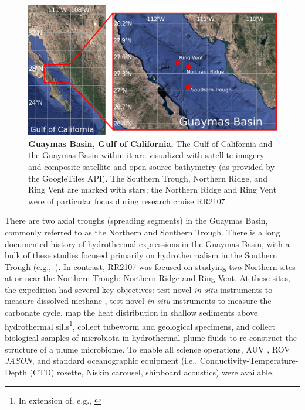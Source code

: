 \begin{figure}[!ht]
  \centering
  \includegraphics[width=\columnwidth]{figures/ops_guaymas.png}
  \caption[Guaymas Basin, Gulf of California.]{\textbf{Guaymas Basin, Gulf of California.} The Gulf of California and the Guaymas Basin within it are visualized with satellite imagery and composite satellite and open-source bathymetry (as provided by the GoogleTiles API). The Southern Trough, Northern Ridge, and Ring Vent are marked with stars; the Northern Ridge and Ring Vent were of particular focus during research cruise RR2107.}
  \label{fig:ops_map}
\end{figure}

There are two axial troughs (spreading segments) in the Guaymas Basin, commonly referred to as the Northern and Southern Trough. There is a long documented history of hydrothermal expressions in the Guaymas Basin, with a bulk of these studies focused primarily on hydrothermalism in the Southern Trough (e.g.,~\cite{ondreas2018recent, teske2016guaymas, seewald1994variations, von1985chemistry, lonsdale1985hydrothermal}). In contrast, RR2107 was focused on studying two Northern sites at or near the Northern Trough: Northern Ridge and Ring Vent. At these sites, the expedition had several key objectives: test novel \emph{in situ} instruments to measure dissolved methane \autocite{kapit2021dissolved,kapit2021measurement,michel2022gas}, test novel \emph{in situ} instruments to measure the carbonate cycle, map the heat distribution in shallow sediments above hydrothermal sills\footnote{In extension of, e.g., \cite{neumann2022heat}}, collect tubeworm and geological specimens, and collect biological samples of microbiota in hydrothermal plume-fluids to re-construct the structure of a plume microbiome. To enable all science operations, AUV \Sentry, ROV \emph{JASON}, and standard oceanographic equipment (i.e., Conductivity-Temperature-Depth (CTD) rosette, Niskin carousel, shipboard acoustics) were available.


